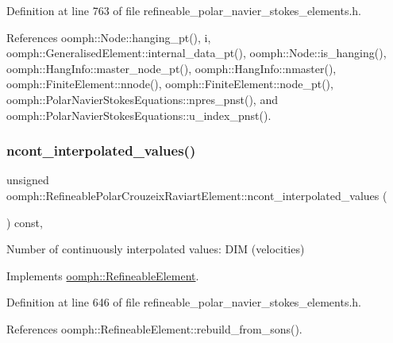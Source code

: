Definition at line 763 of file refineable\+\_\+polar\+\_\+navier\+\_\+stokes\+\_\+elements.\+h.



References oomph\+::\+Node\+::hanging\+\_\+pt(), i, oomph\+::\+Generalised\+Element\+::internal\+\_\+data\+\_\+pt(), oomph\+::\+Node\+::is\+\_\+hanging(), oomph\+::\+Hang\+Info\+::master\+\_\+node\+\_\+pt(), oomph\+::\+Hang\+Info\+::nmaster(), oomph\+::\+Finite\+Element\+::nnode(), oomph\+::\+Finite\+Element\+::node\+\_\+pt(), oomph\+::\+Polar\+Navier\+Stokes\+Equations\+::npres\+\_\+pnst(), and oomph\+::\+Polar\+Navier\+Stokes\+Equations\+::u\+\_\+index\+\_\+pnst().

\mbox{\label{classoomph_1_1RefineablePolarCrouzeixRaviartElement_a7541eaf63cc4f45427acaa169d165f66}} 
\subsubsection{\texorpdfstring{ncont\+\_\+interpolated\+\_\+values()}{ncont\_interpolated\_values()}}
{\footnotesize\ttfamily unsigned oomph\+::\+Refineable\+Polar\+Crouzeix\+Raviart\+Element\+::ncont\+\_\+interpolated\+\_\+values (\begin{DoxyParamCaption}{ }\end{DoxyParamCaption}) const\hspace{0.3cm}{\ttfamily [inline]}, {\ttfamily [virtual]}}



Number of continuously interpolated values\+: D\+IM (velocities) 



Implements \hyperlink{classoomph_1_1RefineableElement_a53e171a18c9f43f1db90a6876516a073}{oomph\+::\+Refineable\+Element}.



Definition at line 646 of file refineable\+\_\+polar\+\_\+navier\+\_\+stokes\+\_\+elements.\+h.



References oomph\+::\+Refineable\+Element\+::rebuild\+\_\+from\+\_\+sons().


